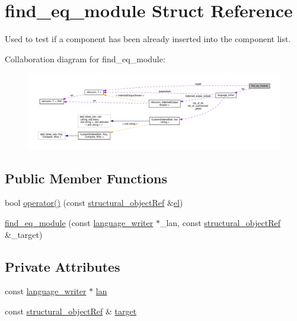\hypertarget{structfind__eq__module}{}\section{find\+\_\+eq\+\_\+module Struct Reference}
\label{structfind__eq__module}


Used to test if a component has been already inserted into the component list.  




Collaboration diagram for find\+\_\+eq\+\_\+module\+:
\nopagebreak
\begin{figure}[H]
\begin{center}
\leavevmode
\includegraphics[width=350pt]{d7/d90/structfind__eq__module__coll__graph}
\end{center}
\end{figure}
\subsection*{Public Member Functions}
\begin{DoxyCompactItemize}
\item 
bool \hyperlink{structfind__eq__module_abdafce23f99ade320f9b7d5e20924732}{operator()} (const \hyperlink{structural__objects_8hpp_a8ea5f8cc50ab8f4c31e2751074ff60b2}{structural\+\_\+object\+Ref} \&\hyperlink{tutorial__pnnl__2019_2optimizations_2second_2solution_2adpcm_8c_a7f3560d6472f5c36bc6290395fc960f0}{el})
\item 
\hyperlink{structfind__eq__module_a0f99234d2d9112b2f4e4b2e2d714b91d}{find\+\_\+eq\+\_\+module} (const \hyperlink{classlanguage__writer}{language\+\_\+writer} $\ast$\+\_\+lan, const \hyperlink{structural__objects_8hpp_a8ea5f8cc50ab8f4c31e2751074ff60b2}{structural\+\_\+object\+Ref} \&\+\_\+target)
\end{DoxyCompactItemize}
\subsection*{Private Attributes}
\begin{DoxyCompactItemize}
\item 
const \hyperlink{classlanguage__writer}{language\+\_\+writer} $\ast$ \hyperlink{structfind__eq__module_a7f7ec449dfd7d5bbe066f518e0f0312e}{lan}
\item 
const \hyperlink{structural__objects_8hpp_a8ea5f8cc50ab8f4c31e2751074ff60b2}{structural\+\_\+object\+Ref} \& \hyperlink{structfind__eq__module_af6445db0606a68f4b32cae24304dbad9}{target}
\end{DoxyCompactItemize}


